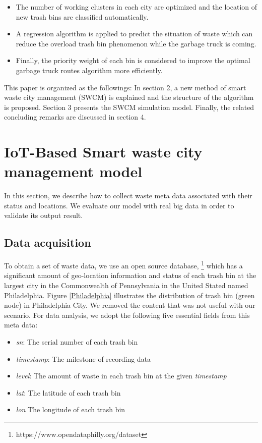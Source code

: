 \documentclass[conference,compsoc]{IEEEtran}
\begin{document}
\begin{itemize}
\item The number of working clusters in each city are optimized and the location of new trash bins are classified automatically. 

\item A regression algorithm is applied to predict the situation of waste which can reduce the overload trash bin phenomenon while the garbage truck is coming.

\item Finally, the priority weight of each bin is considered to improve the optimal garbage truck routes algorithm more efficiently.

\end{itemize}
\par This paper is organized as the followings: In section 2,  a new method of smart waste city management (SWCM) is explained and the structure of the algorithm is proposed. Section 3 presents the SWCM simulation model. Finally, the related concluding remarks are discussed in section 4.



\label{dataacquisition}

\section{IoT-Based Smart waste city management model}


In this section, we describe how to collect waste meta data associated with their status and locations. We evaluate our model with real big data in order to validate its output result.
\subsection{Data acquisition} 
\par To obtain a set of waste data, we use an open source database, \footnote{https://www.opendataphilly.org/dataset} which has a significant amount of geo-location information and status of each trash bin at the largest city in the Commonwealth of Pennsylvania in the United Stated named Philadelphia. Figure \ref{Philadelphia} illustrates the distribution of trash bin (green node) in Philadelphia City. We removed the content that was not useful with our scenario. For data analysis, we adopt the following five essential fields from this meta data:
\begin{itemize}
	\item \textit{sn}: The serial number of each trash bin
	\item \textit{timestamp}: The milestone of recording data
	\item \textit{level}: The amount of waste in each trash bin at the given \textit{timestamp}
	\item \textit{lat}: The latitude of each trash bin
	\item \textit{lon} The longitude of each trash bin
\end{itemize}
\end{document}
